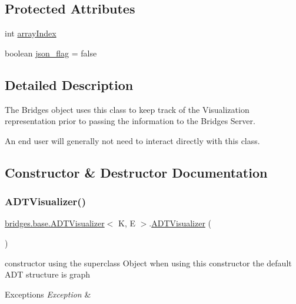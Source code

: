 \subsection*{Protected Attributes}
\begin{DoxyCompactItemize}
\item 
int \hyperlink{classbridges_1_1base_1_1_a_d_t_visualizer_a6304c4131e3e7eb5953402368b0e9e3c}{array\+Index}
\item 
boolean \hyperlink{classbridges_1_1base_1_1_a_d_t_visualizer_abf75be63a37f31ada7f92a84bb1bc536}{json\+\_\+flag} = false
\end{DoxyCompactItemize}


\subsection{Detailed Description}
The Bridges object uses this class to keep track of the Visualization representation prior to passing the information to the Bridges Server. 

An end user will generally not need to interact directly with this class. 

\subsection{Constructor \& Destructor Documentation}
\hypertarget{classbridges_1_1base_1_1_a_d_t_visualizer_a3d5098e4c0609c19a547f19f0d538eeb}{}\label{classbridges_1_1base_1_1_a_d_t_visualizer_a3d5098e4c0609c19a547f19f0d538eeb} 
\subsubsection{\texorpdfstring{A\+D\+T\+Visualizer()}{ADTVisualizer()}\hspace{0.1cm}{\footnotesize\ttfamily [1/2]}}
{\footnotesize\ttfamily \hyperlink{classbridges_1_1base_1_1_a_d_t_visualizer}{bridges.\+base.\+A\+D\+T\+Visualizer}$<$ K, E $>$.\hyperlink{classbridges_1_1base_1_1_a_d_t_visualizer}{A\+D\+T\+Visualizer} (\begin{DoxyParamCaption}{ }\end{DoxyParamCaption})}

constructor using the superclass Object when using this constructor the default A\+DT structure is graph 
\begin{DoxyExceptions}{Exceptions}
{\em Exception} & \\
\hline
\end{DoxyExceptions}
\hypertarget{classbridges_1_1base_1_1_a_d_t_visualizer_af722d7ea9506b1ca8119ae39c43130ff}{}\label{classbridges_1_1base_1_1_a_d_t_visualizer_af722d7ea9506b1ca8119ae39c43130ff} 
